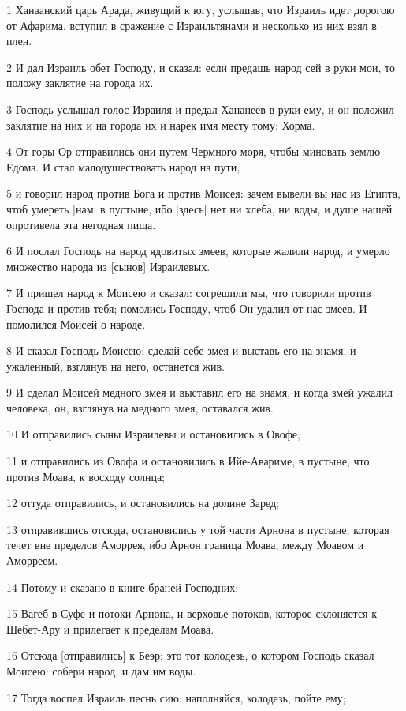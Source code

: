 \par 1 Ханаанский царь Арада, живущий к югу, услышав, что Израиль идет дорогою от Афарима, вступил в сражение с Израильтянами и несколько из них взял в плен.
\par 2 И дал Израиль обет Господу, и сказал: если предашь народ сей в руки мои, то положу заклятие на города их.
\par 3 Господь услышал голос Израиля и предал Хананеев в руки ему, и он положил заклятие на них и на города их и нарек имя месту тому: Хорма.
\par 4 От горы Ор отправились они путем Чермного моря, чтобы миновать землю Едома. И стал малодушествовать народ на пути,
\par 5 и говорил народ против Бога и против Моисея: зачем вывели вы нас из Египта, чтоб умереть [нам] в пустыне, ибо [здесь] нет ни хлеба, ни воды, и душе нашей опротивела эта негодная пища.
\par 6 И послал Господь на народ ядовитых змеев, которые жалили народ, и умерло множество народа из [сынов] Израилевых.
\par 7 И пришел народ к Моисею и сказал: согрешили мы, что говорили против Господа и против тебя; помолись Господу, чтоб Он удалил от нас змеев. И помолился Моисей о народе.
\par 8 И сказал Господь Моисею: сделай себе змея и выставь его на знамя, и ужаленный, взглянув на него, останется жив.
\par 9 И сделал Моисей медного змея и выставил его на знамя, и когда змей ужалил человека, он, взглянув на медного змея, оставался жив.
\par 10 И отправились сыны Израилевы и остановились в Овофе;
\par 11 и отправились из Овофа и остановились в Ийе-Авариме, в пустыне, что против Моава, к восходу солнца;
\par 12 оттуда отправились, и остановились на долине Заред;
\par 13 отправившись отсюда, остановились у той части Арнона в пустыне, которая течет вне пределов Аморрея, ибо Арнон граница Моава, между Моавом и Аморреем.
\par 14 Потому и сказано в книге браней Господних:
\par 15 Вагеб в Суфе и потоки Арнона, и верховье потоков, которое склоняется к Шебет-Ару и прилегает к пределам Моава.
\par 16 Отсюда [отправились] к Беэр; это тот колодезь, о котором Господь сказал Моисею: собери народ, и дам им воды.
\par 17 Тогда воспел Израиль песнь сию: наполняйся, колодезь, пойте ему;
